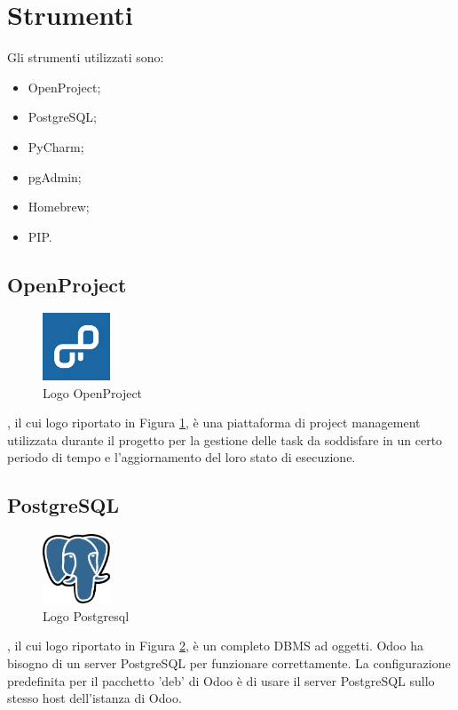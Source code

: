 \section{Strumenti}
Gli strumenti utilizzati sono:
\begin{itemize}
\item OpenProject;
\item PostgreSQL;
\item PyCharm;
\item pgAdmin;
\item Homebrew;
\item PIP.
\end{itemize}
\subsection{OpenProject}
\begin{figure}[H]
	\begin{center} \includegraphics[width=2cm]{figures/openproject}
		\caption[Logo OpenProject]{Logo OpenProject}  
		\label{openproject} 
	\end{center}
\end{figure}
, il cui logo riportato in Figura \ref{openproject}, è una piattaforma di project management utilizzata durante il progetto per la gestione delle task da soddisfare in un certo periodo di tempo e l'aggiornamento del loro stato di esecuzione.

\subsection{PostgreSQL}
\begin{figure}[H]
	\begin{center} \includegraphics[width=2cm]{figures/Logo_Postgresql}
		\caption[Logo Postgresql]{Logo Postgresql}  
		\label{logo_postgresql} 
	\end{center}
\end{figure}
, il cui logo riportato in Figura \ref{logo_postgresql}, è un completo DBMS ad oggetti. Odoo ha bisogno di un server PostgreSQL per funzionare correttamente. La configurazione predefinita per il pacchetto 'deb' di Odoo è di usare il server PostgreSQL sullo stesso host dell'istanza di Odoo.

